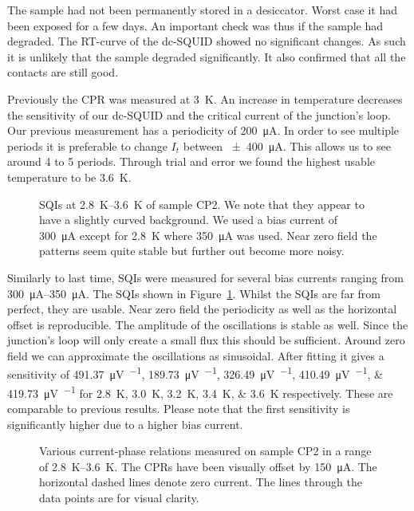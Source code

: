 The sample had not been permanently stored in a desiccator. Worst case it had been exposed for a few days. An important check was thus if the sample had degraded. The RT-curve of the dc-SQUID showed no significant changes. As such it is unlikely that the sample degraded significantly. It also confirmed that all the contacts are still good.

Previously the CPR was measured at \qty{3}{\kelvin}. An increase in temperature decreases the sensitivity of our dc-SQUID and the critical current of the junction's loop. Our previous measurement has a periodicity of \qty{200}{\micro\ampere}. In order to see multiple periods it is preferable to change $I_t$ between \qty{\pm400}{\micro\ampere}. This allows us to see around 4 to 5 periods. Through trial and error we found the highest usable temperature to be \qty{3.6}{\kelvin}.

\begin{figure}[ht!]
	\centering
	
	\caption{SQIs at \qtyrange{2.8}{3.6}{\kelvin} of sample CP2. We note that they appear to have a slightly curved background. We used a bias current of \qty{300}{\micro\ampere} except for \qty{2.8}{\kelvin} where \qty{350}{\micro\ampere} was used. Near zero field the patterns seem quite stable but further out become more noisy.}
	\label{fig:CP2.6B_revisited_SQIs}
\end{figure}

Similarly to last time, SQIs were measured for several bias currents ranging from \qtyrange{300}{350}{\micro\ampere}. The SQIs shown in Figure~\ref{fig:CP2.6B_revisited_SQIs}. Whilst the SQIs are far from perfect, they are usable. Near zero field the periodicity as well as the horizontal offset is reproducible. The amplitude of the oscillations is stable as well. Since the junction's loop will only create a small flux this should be sufficient. Around zero field we can approximate the oscillations as sinusoidal. After fitting it gives a sensitivity of \qtylist{491.37;189.73;326.49;410.49;419.73}{\micro\volt\per\fluxquantum} for \qtylist{2.8;3.0;3.2;3.4;3.6}{\kelvin} respectively. These are comparable to previous results. Please note that the first sensitivity is significantly higher due to a higher bias current.

\begin{figure}[ht!]
	\centering
	
	\caption{Various current-phase relations measured on sample CP2 in a range of \qtyrange{2.8}{3.6}{\kelvin}. The CPRs have been visually offset by \qty{150}{\micro\ampere}. The horizontal dashed lines denote zero current. The lines through the data points are for visual clarity.}
	\label{fig:CP2.6B_revisited_CPRs}
\end{figure}


